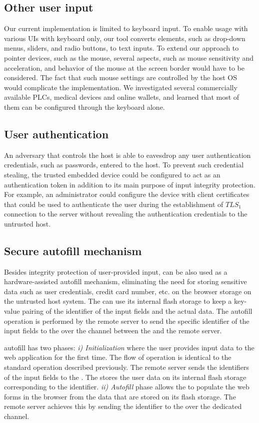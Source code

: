 \subsection{Other user input} Our current implementation is limited to keyboard input. To enable usage with various UIs with keyboard only, our tool converts elements, such as drop-down menus, sliders, and radio buttons, to text inputs. To extend our approach to pointer devices, such as the mouse, several aspects, such as mouse sensitivity and acceleration, and behavior of the mouse at the screen border would have to be considered. The fact that such mouse settings are controlled by the host OS would complicate the implementation. We investigated several commercially available PLCs, medical devices and online wallets, and learned that most of them can be configured through the keyboard alone.

\subsection{User authentication} An adversary that controls the host is able to eavesdrop any user authentication credentials, such as passwords, entered to the host. To prevent such credential stealing, the trusted embedded device could be configured to act as an authentication token in addition to its main purpose of input integrity protection. For example, an administrator could configure the device with client certificates that could be used to authenticate the user during the establishment of $TLS_1$ connection to the server without revealing the authentication credentials to the untrusted host.

\subsection{Secure autofill mechanism} Besides integrity protection of user-provided input, \device can be also used as a hardware-assisted autofill mechanism, eliminating the need for storing sensitive data such as user credentials, credit card number, etc. on the browser storage on the untrusted host system. The \device can use its internal flash storage to keep a key-value pairing of the identifier of the input fields and the actual data. The autofill operation is performed by the remote server to send the specific identifier of the input fields to the \device over the \tls channel between the \device and the remote server. 

\name autofill has two phases: 
\emph{i) Initialization} where the user provides input data to the web application for the first time. The flow of operation is identical to the standard \name operation described previously. The remote server sends the identifiers of the input fields to the \device. The \device stores the user data on its internal flash storage corresponding to the identifier. \emph{ii) Autofill} phase allows the \device to populate the web forms in the browser from the data that are stored on its flash storage. The remote server achieves this by sending the identifier to the \device over the dedicated \tls channel.

